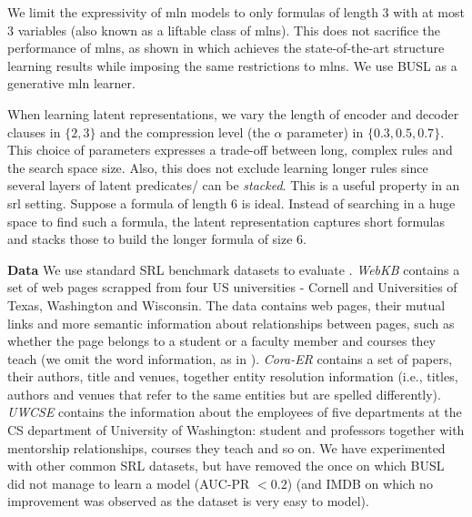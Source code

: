 We limit the expressivity of \gls{mln} models to only formulas of length 3 with at most 3 variables (also known as a liftable class of \gls{mln}s).
This does not sacrifice the performance of \gls{mln}s, as shown in \cite{VanHaaren2016} which achieves the state-of-the-art structure learning results while imposing the same restrictions to \gls{mln}s.
We use BUSL \cite{mihalkova:icml07} as a generative \gls{mln} learner.




When learning latent representations, we vary the length of encoder and decoder clauses in $\{2,3\}$ and the compression level (the $\alpha$ parameter) in $\{0.3, 0.5, 0.7\}$.
This choice of parameters expresses a trade-off between long, complex rules and the search space size.
Also, this does not exclude learning longer rules since several layers of latent predicates/ can be \textit{stacked}.
This is a useful property in an \gls{srl} setting.
Suppose a formula of length 6 is ideal.
Instead of searching in a huge space to find such a formula, the latent representation captures short formulas and stacks those to build the longer formula of size 6.




\textbf{Data}
We use standard SRL benchmark datasets to evaluate .
\textit{WebKB} contains a set of web pages scrapped from four US universities - Cornell and Universities of Texas, Washington and Wisconsin.
The data contains web pages, their mutual links and more semantic information about relationships between pages, such as whether the page belongs to a student or a faculty member and courses they teach (we omit the word information, as in \cite{mihalkova:icml07}).
\textit{Cora-ER} contains a set of papers, their authors, title and venues, together entity resolution information (i.e., titles, authors and venues that refer to the same entities but are spelled differently).
\textit{UWCSE} contains the information about the employees of five departments at the CS department of University of Washington: student and professors together with mentorship relationships, courses they teach and so on.
We have experimented with other common SRL datasets, but have removed the once on which BUSL did not manage to learn a model (AUC-PR $< 0.2$) (and IMDB on which no improvement was observed as the dataset is very easy to model).








